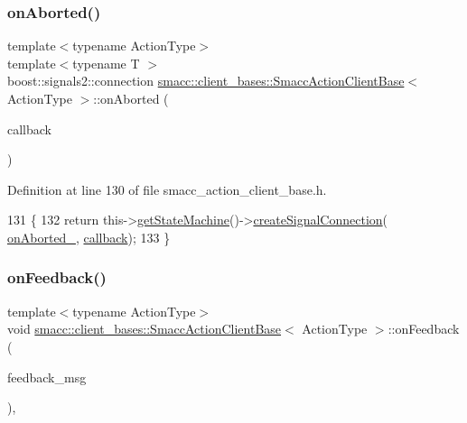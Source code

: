\subsubsection{\texorpdfstring{on\+Aborted()}{onAborted()}\hspace{0.1cm}{\footnotesize\ttfamily [2/2]}}
{\footnotesize\ttfamily template$<$typename Action\+Type$>$ \\
template$<$typename T $>$ \\
boost\+::signals2\+::connection \hyperlink{classsmacc_1_1client__bases_1_1SmaccActionClientBase}{smacc\+::client\+\_\+bases\+::\+Smacc\+Action\+Client\+Base}$<$ Action\+Type $>$\+::on\+Aborted (\begin{DoxyParamCaption}\item[{std\+::function$<$ void(Result\+Const\+Ptr \&)$>$}]{callback }\end{DoxyParamCaption})\hspace{0.3cm}{\ttfamily [inline]}}



Definition at line 130 of file smacc\+\_\+action\+\_\+client\+\_\+base.\+h.


\begin{DoxyCode}
131     \{
132         \textcolor{keywordflow}{return} this->\hyperlink{classsmacc_1_1ISmaccClient_aec51d4712404cb9882b86e4c854bb93a}{getStateMachine}()->\hyperlink{classsmacc_1_1ISmaccStateMachine_adf0f42ade0c65cc471960fe2a7c42da2}{createSignalConnection}(
      \hyperlink{classsmacc_1_1client__bases_1_1SmaccActionClientBase_adc33748ca4fcef9730f8039b75d496d0}{onAborted\_}, \hyperlink{sm__ridgeback__barrel__search__1_2servers_2opencv__perception__node_2opencv__perception__node_8cpp_a050e697bd654facce10ea3f6549669b3}{callback});
133     \}
\end{DoxyCode}
\mbox{\label{classsmacc_1_1client__bases_1_1SmaccActionClientBase_a5a88fd084076729e9cb864e45338af47}} 
\subsubsection{\texorpdfstring{on\+Feedback()}{onFeedback()}}
{\footnotesize\ttfamily template$<$typename Action\+Type$>$ \\
void \hyperlink{classsmacc_1_1client__bases_1_1SmaccActionClientBase}{smacc\+::client\+\_\+bases\+::\+Smacc\+Action\+Client\+Base}$<$ Action\+Type $>$\+::on\+Feedback (\begin{DoxyParamCaption}\item[{const Feedback\+Const\+Ptr \&}]{feedback\+\_\+msg }\end{DoxyParamCaption})\hspace{0.3cm}{\ttfamily [inline]}, {\ttfamily [protected]}}



